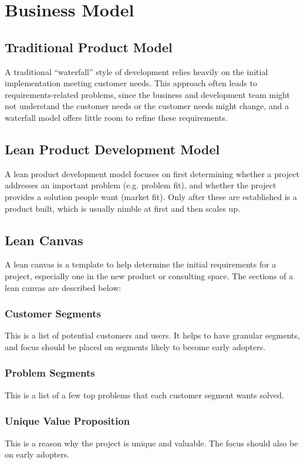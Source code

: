 \documentclass[12pt,titlepage]{article}
\let\stdsection\section
\renewcommand\section{\clearpage\stdsection}
\begin{document}
  \section{Business Model}
    \subsection{Traditional Product Model}
      A traditional ``waterfall'' style of development relies heavily on the initial implementation meeting customer needs. This
      approach often leads to requirements-related problems, since the business and development team might not understand the
      customer needs or the customer needs might change, and a waterfall model offers little room to refine these requirements.

    \subsection{Lean Product Development Model}
      A lean product development model focuses on first determining whether a project addresses an important problem (e.g. problem
      fit), and whether the project provides a solution people want (market fit). Only after these are established is a product built,
      which is usually nimble at first and then scales up.

    \subsection{Lean Canvas}
      A lean canvas is a template to help determine the initial requirements for a project, especially one in the new product or
      consulting space. The sections of a lean canvas are described below:

      \subsubsection{Customer Segments}
        This is a list of potential customers and users. It helps to have granular segments, and focus should be placed on segments likely
        to become early adopters.

      \subsubsection{Problem Segments}
        This is a list of a few top problems that each customer segment wants solved.

      \subsubsection{Unique Value Proposition}
        This is a reason why the project is unique and valuable. The focus should also be on early adopters.
\end{document}
